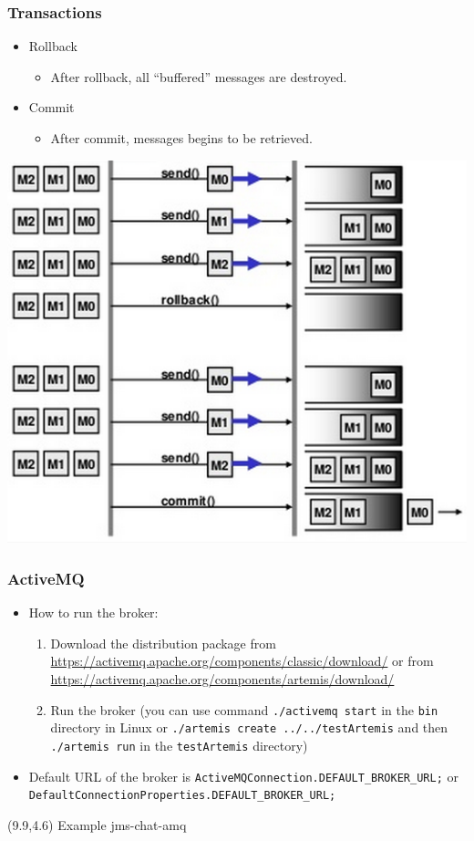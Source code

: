 \documentclass[10pt,xcolor=pdflatex]{beamer}
\begin{document}
\begin{frame}[containsverbatim]\frametitle{Transactions}
\begin{itemize}
  \item Rollback
    \begin{itemize}
	  \item After rollback, all “buffered” messages are destroyed.
    \end{itemize}
  \item Commit
    \begin{itemize}
      \item After commit, messages begins to be retrieved.
    \end{itemize}
\end{itemize}
\begin{center}
\includegraphics[scale=0.57]{img/obr9}
\end{center}
\end{frame}


\begin{frame}[containsverbatim]\frametitle{ActiveMQ}
\begin{itemize}
    \item How to run the broker:
      \begin{enumerate}
          \item Download the distribution package from \url{https://activemq.apache.org/components/classic/download/} or from \url{https://activemq.apache.org/components/artemis/download/}
          \item Run the broker (you can use command \texttt{./activemq start} in the \texttt{bin} directory in Linux or \texttt{./artemis create ../../testArtemis} and then \texttt{./artemis run} in the \texttt{testArtemis} directory)
      \end{enumerate}
    \item Default URL of the broker is \texttt{ActiveMQConnection.DEFAULT\_BROKER\_URL;}
    or \texttt{DefaultConnectionProperties.DEFAULT\_BROKER\_URL;}
\end{itemize}
\begin{textblock}{5}(9.9,4.6)
    {\footnotesize Example jms-chat-amq}
\end{textblock}
\end{frame}
\end{document}
